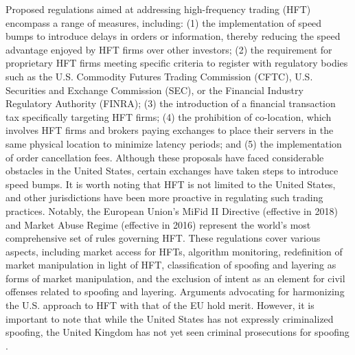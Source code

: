Proposed regulations aimed at addressing high-frequency trading (HFT) encompass a range of measures, including: (1) the
implementation of speed bumps to introduce delays in orders or information, thereby reducing the speed advantage enjoyed
by HFT firms over other investors; (2) the requirement for proprietary HFT firms meeting specific criteria to register
with regulatory bodies such as the U.S. Commodity Futures Trading Commission (CFTC), U.S. Securities and Exchange Commission
(SEC), or the Financial Industry Regulatory Authority (FINRA); (3) the introduction of a financial transaction tax
specifically targeting HFT firms; (4) the prohibition of co-location, which involves HFT firms and brokers paying
exchanges to place their servers in the same physical location to minimize latency periods; and (5) the implementation
of order cancellation fees. Although these proposals have faced considerable obstacles in the United States, certain
exchanges have taken steps to introduce speed bumps. It is worth noting that HFT is not limited to the United States,
and other jurisdictions have been more proactive in regulating such trading practices. Notably, the European Union's
MiFid II Directive (effective in 2018) and Market Abuse Regime (effective in 2016) represent the world's most comprehensive
set of rules governing HFT. These regulations cover various aspects, including market access for HFTs, algorithm monitoring,
redefinition of market manipulation in light of HFT, classification of spoofing and layering as forms of market manipulation,
and the exclusion of intent as an element for civil offenses related to spoofing and layering. Arguments advocating for
harmonizing the U.S. approach to HFT with that of the EU hold merit. However, it is important to note that while the United
States has not expressly criminalized spoofing, the United Kingdom has not yet seen criminal prosecutions for spoofing
\cite{angel2020spoofing, chilton2012perspectives, cataldo2019making}.